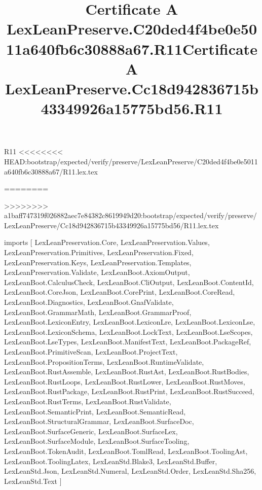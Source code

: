 \begin{lexlean}{R11}
<<<<<<<< HEAD:bootstrap/expected/verify/preserve/LexLeanPreserve/C20ded4f4be0e5011a640fb6c30888a67/R11.lex.tex
\title{Certificate A LexLeanPreserve.C20ded4f4be0e5011a640fb6c30888a67.R11}
========
\title{Certificate A LexLeanPreserve.Cc18d942836715b43349926a15775bd56.R11}
>>>>>>>> a1baff747319f026882aec7e84382c8619949d20:bootstrap/expected/verify/preserve/LexLeanPreserve/Cc18d942836715b43349926a15775bd56/R11.lex.tex
\begin{coremodule}
imports [
  LexLeanPreservation.Core,
  LexLeanPreservation.Values,
  LexLeanPreservation.Primitives,
  LexLeanPreservation.Fixed,
  LexLeanPreservation.Keys,
  LexLeanPreservation.Templates,
  LexLeanPreservation.Validate,
  LexLeanBoot.AxiomOutput,
  LexLeanBoot.CalculusCheck,
  LexLeanBoot.CliOutput,
  LexLeanBoot.ContentId,
  LexLeanBoot.CoreJson,
  LexLeanBoot.CorePrint,
  LexLeanBoot.CoreRead,
  LexLeanBoot.Diagnostics,
  LexLeanBoot.GnafValidate,
  LexLeanBoot.GrammarMath,
  LexLeanBoot.GrammarProof,
  LexLeanBoot.LexiconEntry,
  LexLeanBoot.LexiconLre,
  LexLeanBoot.LexiconLse,
  LexLeanBoot.LexiconSchema,
  LexLeanBoot.LockText,
  LexLeanBoot.LseScopes,
  LexLeanBoot.LseTypes,
  LexLeanBoot.ManifestText,
  LexLeanBoot.PackageRef,
  LexLeanBoot.PrimitiveScan,
  LexLeanBoot.ProjectText,
  LexLeanBoot.PropositionTerms,
  LexLeanBoot.RuntimeValidate,
  LexLeanBoot.RustAssemble,
  LexLeanBoot.RustAst,
  LexLeanBoot.RustBodies,
  LexLeanBoot.RustLoops,
  LexLeanBoot.RustLower,
  LexLeanBoot.RustMoves,
  LexLeanBoot.RustPackage,
  LexLeanBoot.RustPrint,
  LexLeanBoot.RustSucceed,
  LexLeanBoot.RustTerms,
  LexLeanBoot.RustValidate,
  LexLeanBoot.SemanticPrint,
  LexLeanBoot.SemanticRead,
  LexLeanBoot.StructuralGrammar,
  LexLeanBoot.SurfaceDoc,
  LexLeanBoot.SurfaceGeneric,
  LexLeanBoot.SurfaceLex,
  LexLeanBoot.SurfaceModule,
  LexLeanBoot.SurfaceTooling,
  LexLeanBoot.TokenAudit,
  LexLeanBoot.TomlRead,
  LexLeanBoot.ToolingAst,
  LexLeanBoot.ToolingLatex,
  LexLeanStd.Blake3,
  LexLeanStd.Buffer,
  LexLeanStd.Json,
  LexLeanStd.Numeral,
  LexLeanStd.Order,
  LexLeanStd.Sha256,
  LexLeanStd.Text
]


\end{coremodule}
\end{lexlean}
